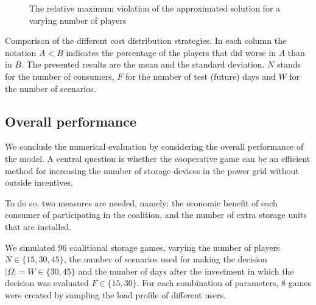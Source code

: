 \begin{figure}[]

  \caption{The relative maximum violation of the approximated solution for a varying number of players}
  \label{fig:rel_eps}
\end{figure}

\begin{table*}[t]
  \centering
  \caption{Comparison of the different cost distribution strategies. In each column the notation $A < B$ indicates the percentage of the players that did worse in $A$ than in $B$. The presented results are the mean and the standard deviation. $N$ stands for the number of consumers, $F$ for the number of test (future) days and $W$ for the number of scenarios.}
  \label{tab:general_performance}
  \resizebox{\linewidth}{!}{}
\end{table*}

\subsection{Overall performance}\label{sub:gp}

We conclude the numerical evaluation by considering the overall performance of the model. A central question is whether the cooperative game can be an efficient method for increasing the number of storage devices in the power grid without outside incentives.

To do so, two measures are needed, namely: the economic benefit of each consumer of participating in the coalition, and the number of extra storage units that are installed.

We simulated 96 coalitional storage games, varying the number of players $N \in \{15, 30, 45\}$, the number of scenarios used for making the decision $|\Omega| = W \in \{30, 45\}$ and the number of days after the investment in which the decision was evaluated $F \in \{15, 30\}$. For each combination of parameters, 8 games were created by sampling the load profile of different users.

